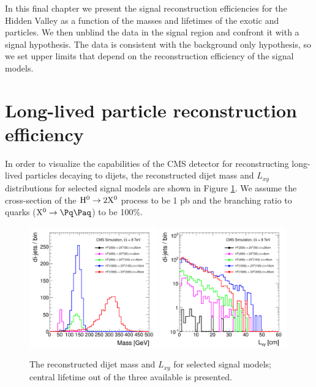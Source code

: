 In this final chapter we present the signal reconstruction efficiencies for the
 Hidden Valley
as a function of the masses and lifetimes of the exotic \Higgs and \X particles. 
We then unblind the data in the signal region and confront it with a
 signal hypothesis. The data is consistent with the background only hypothesis, so we
set upper limits that depend on the reconstruction efficiency of the signal models.

\section{Long-lived particle reconstruction efficiency}
\label{sec:signalefficiency}

In order to visualize the capabilities of the CMS detector for reconstructing long-lived particles decaying to 
dijets, 
the reconstructed dijet mass and $L_{xy}$ distributions for selected signal models are shown in Figure
\ref{fig:signal}. We assume the cross-section of the $\mathrm{H}^{0} \to 2\mathrm{X^{0}}$ process to be 1 pb and the branching 
ratio to quarks ($\X \to \qq$) to be 100\%.

\begin{figure}[htbp]
\centering
\includegraphics[width=0.49\textwidth]{plots/signal/mass.pdf}
\includegraphics[width=0.49\textwidth]{plots/signal/Lxy.pdf}
\caption{The reconstructed dijet mass and $L_{xy}$ for selected signal models; central lifetime out of the three available is presented.\label{fig:signal}}
\end{figure}

